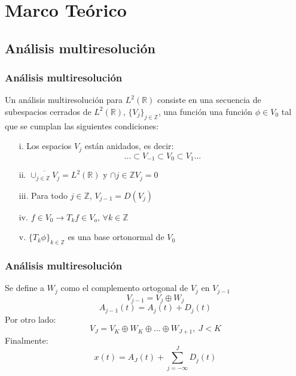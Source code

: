 \documentclass{beamer}
\begin{document}
  \section{Marco Teórico}
  \subsection{Análisis multiresolución}
   
  
  \begin{frame}
   \frametitle{ Análisis multiresolución }
   Un análisis multiresolución para $L^{2}(\mathbb{R})$ consiste en una secuencia de subespacios cerrados de $L^{2}(\mathbb{R})$, $\{ V_{j} \}_{j \in \mathbb{Z} }$, una función  una función $\phi \in V_{0}$ tal que se cumplan las siguientes condiciones:

   \begin{itemize}
   \item[i.] Los espacios $V_{j}$ están anidados, es decir:
   \begin{equation*}
   ... \subset V_{-1} \subset V_{0} \subset V_{1} ...
   \end{equation*}
   \item[ii.] $\overline{\cup _{j\in \mathbb Z}V_j} = L^2(\mathbb R)$ y $\cap {j\in \mathbb Z}V_j = {0}$
   \item[iii.] Para todo $j \in \mathbb{Z}$, $V_{j-1}=D(V_j)$
   \item[iv.] $f \in V_0 \rightarrow T_kf \in V_o$, $\forall k \in \mathbb{Z}$
   \item[v.] $\{T_k \phi \}_{k \in \mathbb{Z}}$ es una base ortonormal de $V_0$
   \end{itemize} 
  \end{frame}
\begin{frame}
  \frametitle{Análisis multiresolución}
 Se define a $W_j$ como el complemento ortogonal de $V_j$ en $V_{j-1}$
  \begin{equation}
    \label{Central}
    V_{j-1} = V_j \oplus W_j
  \end{equation}
  \begin{equation}
    \label{NivApDet}
    A_{j-1}(t) = A_j(t) + D_j(t) 
  \end{equation} 
Por otro lado:
\begin{equation}
  V_J = V_K \oplus W_K \oplus ... \oplus W_{J+1}, \: J<K
  \label{eq.Vj}
  \end{equation}
Finalmente:
\begin{equation}
  x(t) = A_J(t) + \sum_{j=-\infty}^{J}D_j(t)
  \end{equation}

\end{frame}
\end{document}
